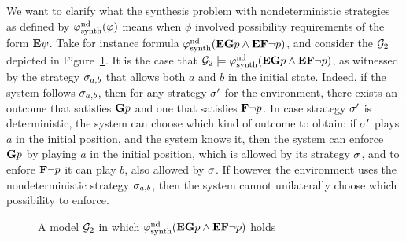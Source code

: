 We want to clarify what the synthesis problem with nondeterministic
strategies as defined by $\varphi^{\text{nd}}_{\text{synth}}(\varphi)$ means when $\phi$
involved possibility requirements of the form ${\bf E}\psi$.
Take for instance formula $\varphi^{\text{nd}}_{\text{synth}}({\bf E} {\bf G} p
  \wedge {\bf E} {\bf F} \neg p)$, and consider the \CGS $\CGS_2$ depicted in
  Figure~\ref{fig:exampleb}. It is the case that $\CGS_2\models\phisynthndet(\E \always p
  \wedge \E \F \neg p)$, as witnessed by the strategy $\sigma_{a,b}$ that allows both
  $a$ and $b$ in the initial state. Indeed, if the system follows
  $\sigma_{a,b}$, then for any strategy $\sigma'$ for the environment, there
  exists an outcome that satisfies ${\bf G} p$ and one that satisfies
  ${\bf F} \neg p$. In case strategy $\sigma'$ is deterministic, the system
  can choose which kind of outcome to obtain: if $\sigma'$ plays $a$
  in the initial position, and the system knows it, then the system
  can enforce ${\bf G} p$ by playing $a$ in the initial position, which is
  allowed by its strategy $\sigma$, and to enfore ${\bf F}\neg p$ it can
  play $b$, also allowed by $\sigma$. If however the environment
uses the nondeterministic  strategy $\sigma_{a,b}$, then the system cannot unilaterally choose
  which possibility to enforce.

\begin{figure}
  \centering
{}  
  \caption{A model $\CGS_2$ in which $\varphi^{\text{nd}}_{\text{synth}}({\bf E} {\bf G} p
  \wedge {\bf E} {\bf F} \neg p)$ holds}
  \label{fig:exampleb}
\end{figure}

